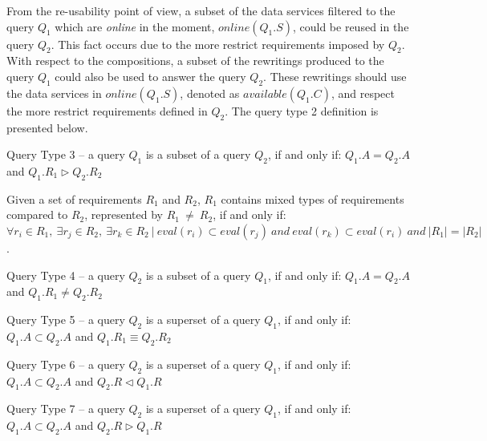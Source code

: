 From the re-usability point of view, a subset of the data services filtered to the query $Q_{1}$ which are \textit{online} in the moment, $online(Q_{1}.S)$, could be reused in the query $Q_{2}$. This fact occurs due to the more restrict requirements imposed by $Q_{2}$.
With respect to the compositions, a subset of the rewritings produced to the query $Q_{1}$ could also be used to answer the query $Q_{2}$. These rewritings should use the data services in $online(Q_{1}.S)$, denoted as $available(Q_{1}.C)$, and respect the more restrict requirements defined in $Q_{2}$. 
The query type 2 definition is presented below.

\begin{definition}\label{def:qt2}
Query Type 3 -- a query $Q_{1}$ is a subset of a query $Q_{2}$, if and only if: $Q_{1}.A = Q_{2}.A$ and $Q_{1}.R_{1} \rhd Q_{2}.R_{2}$
\end{definition}


\begin{definition}\label{def:reqmoreless}
Given a set of  requirements $R_{1}$ and $R_{2}$, $R_{1}$ contains mixed types of requirements compared to $R_{2}$, represented by $R_{1} \ \neq \ R_{2}$, if and only if: $\forall r_{i} \in R_{1}, \ \exists r_{j} \in R_{2}, \ \exists r_{k} \in R_{2} \ \vert \ eval (r_{i}) \subset eval(r_{j}) \ and \ eval (r_{k}) \subset eval(r_{i}) \ and \ \vert R_{1} \vert = \vert R_{2} \vert$.
\end{definition}

\begin{definition}\label{def:qt2}
Query Type 4 -- a query $Q_{2}$ is a subset of a query $Q_{1}$, if and only if: $Q_{1}.A = Q_{2}.A$ and $Q_{1}.R_{1} \neq Q_{2}.R_{2}$
\end{definition}

\begin{definition}\label{def:qt2}
Query Type 5 -- a query $Q_{2}$ is a superset of a query $Q_{1}$, if and only if: $Q_{1}.A \subset Q_{2}.A$ and $Q_{1}.R_{1} \equiv Q_{2}.R_{2}$
\end{definition}

\begin{definition}\label{def:qt2}
Query Type 6 -- a query $Q_{2}$ is a superset of a query $Q_{1}$, if and only if: $Q_{1}.A \subset Q_{2}.A$ and $Q_{2}.R \triangleleft Q_{1}.R$
\end{definition}

\begin{definition}\label{def:qt2}
Query Type 7 -- a query $Q_{2}$ is a superset of a query $Q_{1}$, if and only if: $Q_{1}.A \subset Q_{2}.A$ and $Q_{2}.R \triangleright Q_{1}.R$
\end{definition}

